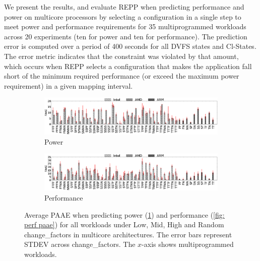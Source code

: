 We present the results, and evaluate REPP when predicting performance and power on
multicore processors by selecting a configuration in a single step to meet power and
performance requirements for 35 multiprogrammed workloads across 20 experiments (ten for
power and ten for performance).  The prediction error is computed over a period of 400
seconds for all DVFS states and Cl-States. The error metric indicates that the constraint
was violated by that amount, which occurs when REPP selects a configuration that makes
the application fall short of the minimum required performance (or exceed the maximum
power requirement) in a given mapping interval. 

\begin{figure}[t]
   \centering
    \begin{subfigure}{\textwidth}
        \centering
        \includegraphics[width=\linewidth]{Chapter3/Figs/multicore/power-shorter-paae.eps}
        \caption{Power}
        \label{fig: power paae}
    \end{subfigure}
    \begin{subfigure}{\textwidth}
        \centering
        \includegraphics[width=\linewidth]{Chapter3/Figs/multicore/perf-shorter-paae.eps}
        \caption{Performance}
        \label{fig: perf paae}
    \end{subfigure} \caption[Average PAAE for REPP with multiple
    constraints]{ Average
    PAAE when predicting power (\ref{fig: power paae}) and performance (\ref{fig: perf
    paae}) for all workloads under Low, Mid, High and Random change\_factors in multicore
    architectures. The error bars represent STDEV across change\_factors. The $x$-axis
    shows multiprogrammed workloads.} 
\label{fig: multicore result} 
\end{figure}

